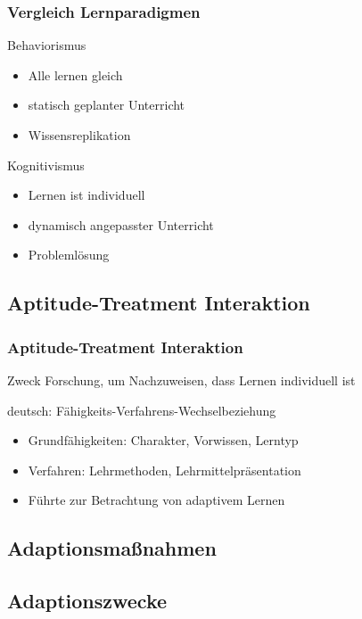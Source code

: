 \documentclass{beamer}
\begin{document}
  \begin{frame}
  \frametitle{Vergleich Lernparadigmen}
    \begin{alertblock}{Behaviorismus}
     \begin{itemize}
       \item Alle lernen gleich
       \item statisch geplanter Unterricht
       \item Wissensreplikation
     \end{itemize}
    \end{alertblock}

    \begin{block}{Kognitivismus}
     \begin{itemize}
       \item Lernen ist individuell
       \item dynamisch angepasster Unterricht
       \item Problemlösung
     \end{itemize}
    \end{block}
  \end{frame}
\subsection{Aptitude-Treatment Interaktion}
\begin{frame}
  \frametitle{Aptitude-Treatment Interaktion}

  \begin{block}{Zweck}
    Forschung, um Nachzuweisen, dass Lernen individuell ist
  \end{block}

  \begin{block}{deutsch:}
    Fähigkeits-Verfahrens-Wechselbeziehung
  \end{block}

  \begin{itemize}
    \item Grundfähigkeiten: Charakter, Vorwissen, Lerntyp
    \item Verfahren: Lehrmethoden, Lehrmittelpräsentation
    \item Führte zur Betrachtung von adaptivem Lernen
  \end{itemize}
\end{frame}
\subsection{Adaptionsmaßnahmen}
\subsection{Adaptionszwecke}
\end{document}
